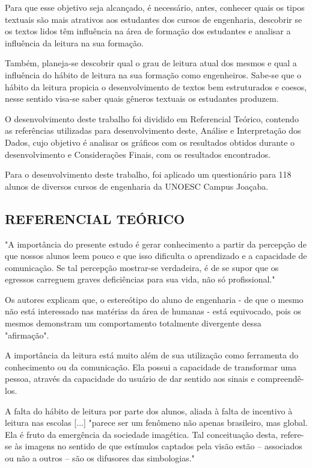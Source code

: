 \documentclass[
	article,			%
	11pt,				%
	oneside,			%
	a4paper,			%
	english,			%
	brazil,				%
	sumario=tradicional
	]{abntex2}
\begin{document}
Para que esse objetivo seja alcançado, é necessário, antes, conhecer quais os tipos textuais são mais atrativos aos estudantes dos cursos de engenharia, descobrir se os textos lidos têm influência na área de formação dos estudantes e analisar a influência da leitura na sua formação.

Também, planeja-se descobrir qual o grau de leitura atual dos mesmos e qual a influência do hábito de leitura na sua formação como engenheiros. Sabe-se que o hábito da leitura propicia o desenvolvimento de textos bem estruturados e coesos, nesse sentido visa-se saber quais gêneros textuais os estudantes produzem.

O desenvolvimento deste trabalho foi dividido em Referencial Teórico, contendo as referências utilizadas para desenvolvimento deste, Análise e Interpretação dos Dados, cujo objetivo é analisar os gráficos com os resultados obtidos durante o desenvolvimento e Considerações Finais, com os resultados encontrados.

Para o desenvolvimento deste trabalho, foi aplicado um questionário para 118 alunos de diversos cursos de engenharia da UNOESC Campus Joaçaba. 



\subsection{REFERENCIAL TEÓRICO}
"A importância do presente estudo é gerar conhecimento a partir da percepção de que nossos alunos leem pouco e que isso dificulta o aprendizado e a capacidade de comunicação. Se tal percepção mostrar-se verdadeira, é de se supor que os egressos carreguem graves deficiências para sua vida, não só profissional." \cite[p.9.132]{habitosleit}

Os autores  explicam que, o estereótipo do aluno de engenharia - de que o mesmo não está interessado nas matérias da área de humanas - está equivocado, pois os mesmos demonstram um comportamento totalmente divergente dessa "afirmação".

A importância da leitura está muito além de sua utilização como ferramenta do conhecimento ou da comunicação. Ela possui a capacidade de transformar uma pessoa, através da capacidade do usuário de dar sentido aos sinais e compreendê-los.

A falta do hábito de leitura por parte dos alunos, aliada à falta de incentivo à leitura nas escolas [...] "parece ser um fenômeno não apenas brasileiro, mas global. Ela é fruto da emergência da sociedade imagética. Tal conceituação desta, refere-se às imagens no sentido de que estímulos captados pela visão estão – associados ou não a outros – são os difusores das simbologias." \cite[p.9.132]{habitosleit}
\end{document}
